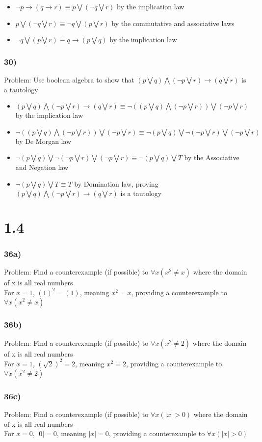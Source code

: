 \documentclass{article}
\begin{document}
\begin{itemize}
	\item $\neg p \rightarrow (q \rightarrow r) \equiv p \bigvee (\neg q \bigvee r)$ by the implication law
	\item $p \bigvee (\neg q \bigvee r) \equiv \neg q \bigvee (p \bigvee r)$ by the commutative and associative laws
	\item $\neg q \bigvee (p \bigvee r) \equiv q \rightarrow (p \bigvee q)$ by the implication law 
\end{itemize}
\subsubsection*{30)}
Problem: Use boolean algebra to show that $(p \bigvee q) \bigwedge (\neg p \bigvee r) \rightarrow (q \bigvee r)$ is a tautology

\begin{itemize}
	\item $(p \bigvee q) \bigwedge (\neg p \bigvee r) \rightarrow (q \bigvee r) \equiv \neg ((p \bigvee q) \bigwedge (\neg p \bigvee r)) \bigvee (\neg p \bigvee r)$ by the implication law
	\item $\neg ((p \bigvee q) \bigwedge (\neg p \bigvee r)) \bigvee (\neg p \bigvee r) \equiv \neg (p \bigvee q) \bigvee \neg (\neg p \bigvee r) \bigvee (\neg p \bigvee r)$ by De Morgan law
	\item $\neg (p \bigvee q) \bigvee \neg (\neg p \bigvee r) \bigvee (\neg p \bigvee r) \equiv \neg (p \bigvee q) \bigvee T$ by the Associative and Negation law
	\item $\neg (p \bigvee q) \bigvee T \equiv T$ by Domination law, proving $(p \bigvee q) \bigwedge (\neg p \bigvee r) \rightarrow (q \bigvee r)$ is a tautology 
\end{itemize}

\section*{1.4}
\subsubsection*{36a)}
Problem: Find a counterexample (if possible) to $\forall x(x^2 \neq x)$ where the domain of x is all real numbers\\
For $x=1$, $(1)^2=(1)$, meaning $x^2 = x$, providing a counterexample to $\forall x(x^2 \neq x)$

\subsubsection*{36b)}
Problem: Find a counterexample (if possible) to $\forall x(x^2 \neq 2)$ where the domain of x is all real numbers\\
For $x=1$, $(\sqrt{2})^2=2$, meaning $x^2=2$, providing a counterexample to $\forall x(x^2 \neq 2)$

\subsubsection*{36c)}
Problem: Find a counterexample (if possible) to $\forall x(|x| > 0)$ where the domain of x is all real numbers\\
For $x=0$, $|0| = 0$, meaning $|x| = 0$, providing a counterexample to $\forall x(|x| > 0)$
\end{document}
